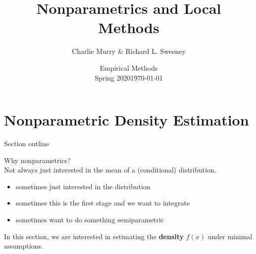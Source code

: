 \documentclass[11pt, aspectratio=169]{beamer}
\title [Non-parametrics]{Nonparametrics and Local Methods}
\author{Charlie Murry \& Richard L. Sweeney}
\institute{based on slides by Chris Conlon}
\date{Empirical Methods \\ Spring 2020}
\date{\today}
\begin{document}

\begin{frame}
\maketitle
\end{frame}




\begin{frame}
  \tableofcontents  
\end{frame}

\section[Density Estimation]{Nonparametric Density Estimation}

\begin{frame}{Section outline}

Why nonparametrics?\\[1em]

Not always just interested in the mean of a (conditional) distribution. 

\begin{itemize}
  \item sometimes just interested in the distribution %
  \item sometimes this is the first stage and we want to integrate
  \item sometimes want to do something semiparametric 
\end{itemize}

In this section, we are interested in estimating the \textbf{density} $f(x)$ under minimal assumptions. 

\end{frame}
\end{document}
